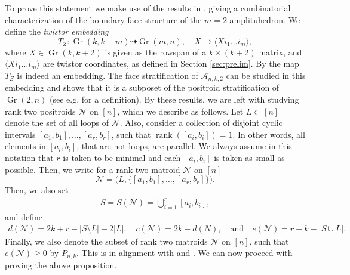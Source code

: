 \documentclass[12pt]{extarticle}
\theoremstyle{definition}
\theoremstyle{theorem}
\theoremstyle{remark}
\numberwithin{equation}{section}
\DeclareMathOperator{\gr}{Gr}
\newcommand{\grk}{\operatorname{Gr}(k,k+2)}
\newcommand{\aA}{\mathcal{A}}
\begin{document}
To prove this statement we make use of the results in \cite{lam_face_structure}, giving a combinatorial characterization of the boundary face structure of the $m=2$ amplituhedron.
We define the \emph{twistor embedding}
\[
    T_Z:\gr(k,k+m)\dashrightarrow\gr(m,n),\quad X\mapsto  \langle Xi_1\ldots i_m\rangle,
\]
where $X\in\grk$ is given as the rowspan of a $k\times(k+2)$ matrix, and $\langle Xi_1\ldots i_m \rangle$ are twistor coordinates, as defined in Section \ref{sec:prelim}.
By \cite[Lemma 1]{lam_face_structure} the map $T_Z$ is indeed an embedding.
The face stratification of $\aA_{n,k,2}$ can be studied in this embedding and \cite[Theorem 25]{lam_face_structure} shows that it is a subposet of the positroid stratification of $\gr(2,n)$ (see e.g. \cite[Section 3]{lam_face_structure} for a definition).
By these results, we are left with studying rank two positroids $\mathcal N$ on $[n]$, which we describe as follows.
Let $L \subset [n]$ denote the set of all loops of $\mathcal{N}$.
Also, consider a collection of disjoint cyclic intervals $[a_1,b_1], \ldots, [a_r,b_r]$, such that $\operatorname{rank}([a_i,b_i]) = 1$. 
In other words, all elements in $[a_i,b_i]$, that are not loops, are parallel. 
We always assume in this notation that $r$ is taken to be minimal and each $[a_i,b_i]$ is taken as small as possible. 
Then, we write for a rank two matroid $\mathcal{N}$ on $[n]$ 
\[
    \mathcal N = \big(L,\{[a_1,b_1],\ldots,[a_r,b_r]\}\big).
\] 
Then, we also set
\begin{align}\label{eq:S_matroid}
    S = S(\mathcal N) = \bigcup_{i=1}^r [a_i,b_i],
\end{align}
and define
\begin{align}\label{eq:other_matroid_numbers}
    d(\mathcal N) = 2k + r - |S \setminus L| - 2|L|,\quad
    c(\mathcal N) = 2k - d(N),\quad\text{and}\quad
    e(\mathcal N) = r + k - |S \cup L|.
\end{align}
Finally, we also denote the subset of rank two matroids $\mathcal{N}$ on $[n]$, such that $e(\mathcal N)\geq 0$ by $P_{n,k}$.
This is in alignment with \cite[Definition 13]{lam_face_structure} and \cite[Theorem 16]{lam_face_structure}.
We can now proceed with proving the above proposition.
\end{document}
